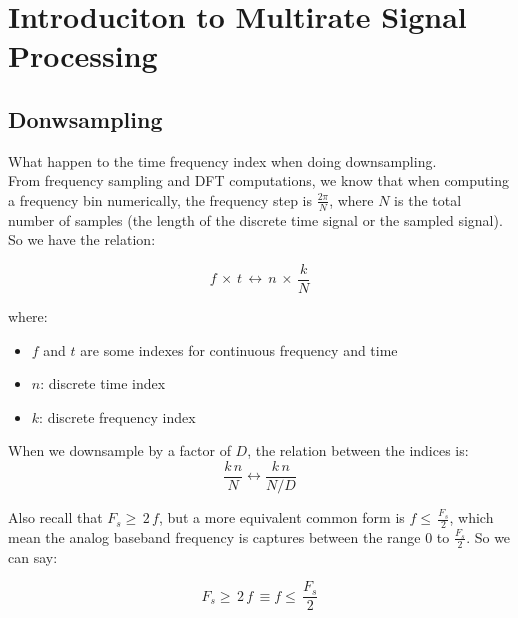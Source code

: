 

\chapter{Introduciton to Multirate Signal Processing}

\section{Donwsampling}

What happen to the time frequency index when doing downsampling.\\

From frequency sampling and DFT computations, we know that when computing a frequency bin numerically, the frequency step is $\displaystyle\frac{2 \pi}{N}$, where $N$ is the total number of samples (the length of the discrete time signal or the sampled signal).\\

So we have the relation:

\begin{equation}
f \, \times \, t \, \leftrightarrow \, n \, \times \,  \displaystyle\frac{k}{N}
\end{equation}

where:

\begin{itemize}
    \item $f$ and $t$ are some indexes for continuous frequency and time 
    
    \item $n$: discrete time index
    
    \item $k$: discrete frequency index
\end{itemize}

When we downsample by a factor of $D$, the relation between the indices is:
\begin{equation}
\displaystyle\frac{k \, n}{N} \leftrightarrow   \displaystyle\frac{k \, n}{N/D}
\end{equation}

Also recall that $F_s \geq \, 2 \, f$, but a more equivalent common form is $f \leq \, \displaystyle\frac{F_s}{2}$, which mean the analog baseband frequency is captures between the range 0 to $\displaystyle\frac{F_s}{2}$. So we can say:

\begin{equation}
  F_s \geq \, 2 \, f \, \equiv  f \leq \, \displaystyle\frac{F_s}{2} 
\end{equation}

